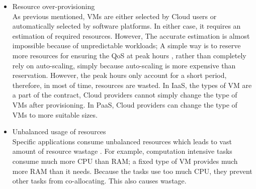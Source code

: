 \begin{itemize}
	\item Resource over-provisioning \\
	As previous mentioned, VMs are either selected by Cloud users or automatically selected by software platforms. In either case, it requires an estimation of required resources. However, The accurate estimation is almost impossible because of unpredictable workloads; A simple way is to reserve more resources for ensuring the QoS at peak hours \cite{Chaisiri:2012cv}, rather than completely rely on auto-scaling, simply because auto-scaling is more expensive than reservation. However, the peak hours only account for a short period, therefore, in most of time, resources are wasted. In IaaS, the types of VM are a part of the contract, Cloud providers cannot simply change the type of VMs after provisioning. In PaaS, Cloud providers can change the type of VMs to more suitable sizes.

	\item Unbalanced usage of resources \\
	Specific applications consume unbalanced resources which leads to vast amount of resource wastage \cite{Tomas:2013iv}. For example, computation intensive tasks consume much more CPU than RAM; a fixed type of VM provides much more RAM than it needs. Because the tasks use too much CPU, they prevent other tasks from co-allocating. This also causes wastage.


\end{itemize}

